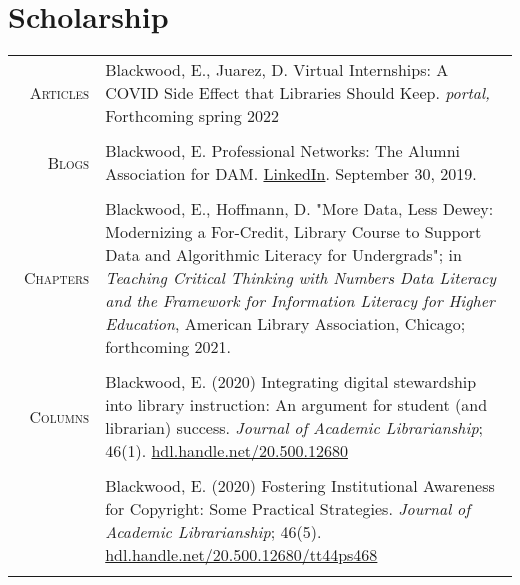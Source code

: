 \documentclass[a4paper,10pt]{article}
\begin{document}
\section{Scholarship}
\begin{tabular}{r|p{11cm}}
 \textsc{Articles}
 & Blackwood, E., Juarez, D. Virtual Internships: A COVID Side Effect that Libraries Should Keep. \emph{portal,} Forthcoming spring 2022\\\multicolumn{2}{c}{} \\\
  \textsc{Blogs}
 & Blackwood, E. Professional Networks: The Alumni Association for DAM. \href{https://www.linkedin.com/pulse/professional-networks-alumni-association-dam-elizabeth-blackwood/</a}{LinkedIn}. September 30, 2019.\\\multicolumn{2}{c}{} \\\
 \textsc{Chapters}
 & Blackwood, E., Hoffmann, D. "More Data, Less Dewey: Modernizing a For-Credit, Library Course to Support Data and Algorithmic Literacy for Undergrads"; in \emph{Teaching Critical Thinking with Numbers Data Literacy and the Framework for Information Literacy for Higher Education}, American Library Association, Chicago; forthcoming 2021.\\\multicolumn{2}{c}{} \\\
 \textsc{Columns}
 & Blackwood, E. (2020) Integrating digital stewardship into library instruction: An argument for
student (and librarian) success. \emph{Journal of Academic Librarianship}; 46(1).
\href{http://hdl.handle.net/20.500.12680/gx41mj565}{hdl.handle.net/20.500.12680}
\\&\\
 & Blackwood, E. (2020) Fostering Institutional Awareness for Copyright: Some Practical Strategies. \emph{Journal of Academic Librarianship}; 46(5).
\href{http://hdl.handle.net/20.500.12680/tt44ps468}{hdl.handle.net/20.500.12680/tt44ps468}\\\multicolumn{2}{c}{} \\


\end{tabular}
\end{document}
